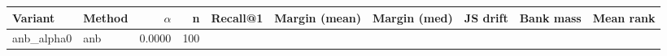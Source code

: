 \begin{tabular}{l l r r r r r r r r}
\toprule
Variant & Method & $\alpha$ & n & Recall@1 & Margin (mean) & Margin (med) & JS drift & Bank mass & Mean rank \\
\midrule
anb\_alpha0 & anb & 0.0000 & 100 &  &  &  &  &  &  \\
\bottomrule
\end{tabular}
